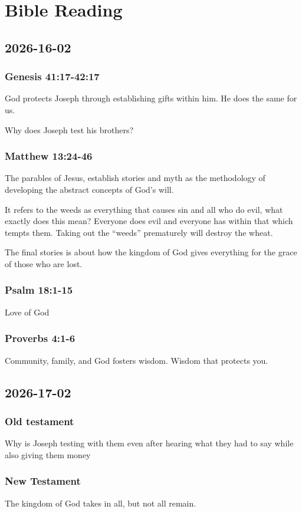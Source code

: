 \chapter{Bible Reading}

\section{2026-16-02}
\subsection{Genesis 41:17-42:17}

God protects Joseph through establishing gifts within him. He does the same for us.

Why does Joseph test his brothers?
\subsection{Matthew 13:24-46}

The parables of Jesus, establish stories and myth as the methodology of developing the abstract concepts of God's will.

It refers to the weeds as everything that causes sin and all who do evil, what exactly does this mean? Everyone does evil and
everyone has within that which tempts them. Taking out the ``weeds'' prematurely will destroy the wheat.

The final stories is about how the kingdom of God gives everything for the grace of those who are lost.
\subsection{Psalm 18:1-15}
Love of God
\subsection{Proverbs 4:1-6}
Community, family, and God fosters wisdom. Wisdom that protects you.


\section{2026-17-02}
\subsection{Old testament}
Why is Joseph testing with them even after hearing what they had to say while also giving them money
\subsection{New Testament}
The kingdom of God takes in all, but not all remain.

